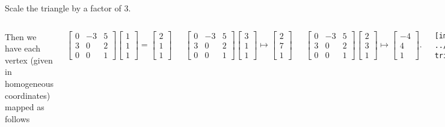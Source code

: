 \documentclass[xcoler=dvipsnames, aspectratio=169]{beamer}
\begin{document}
\begin{frame}

\bb
\ii \alert{Scale the triangle by a factor of 3.}
\pause\ii {}
\pause\ii {}
\ee

\pause
\begin{columns}[T]

\column{0.5\tw}
Then we have each vertex (given in homogeneous coordinates) mapped as follows

$$\begin{bmatrix} 0 & -3 & 5\\
3 & 0 & 2 \\ 0 & 0 & 1 \end{bmatrix} \begin{bmatrix} 1 \\ 1 \\ 1 \end{bmatrix} = \begin{bmatrix} 2 \\ 1 \\ 1 \end{bmatrix}$$

$$\begin{bmatrix} 0 & -3 & 5\\
3 & 0 & 2 \\ 0 & 0 & 1 \end{bmatrix} \begin{bmatrix} 3 \\ 1 \\ 1 \end{bmatrix} \mapsto \begin{bmatrix} 2 \\ 7 \\ 1 \end{bmatrix}$$

$$\begin{bmatrix} 0 & -3 & 5\\
3 & 0 & 2 \\ 0 & 0 & 1 \end{bmatrix} \begin{bmatrix} 2 \\ 3 \\ 1 \end{bmatrix} \mapsto \begin{bmatrix} -4 \\ 4 \\ 1 \end{bmatrix}.$$

\column{0.5\tw}

\texttt{[image: ../Images/Chap2/fig-triangle-combo2.png]}

\end{columns}

\end{frame}
\end{document}
